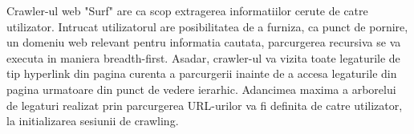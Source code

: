 Crawler-ul web "Surf" are ca scop extragerea informatiilor cerute de catre utilizator. Intrucat utilizatorul are posibilitatea de a furniza, ca punct de pornire, un domeniu web relevant pentru informatia cautata, parcurgerea recursiva se va executa in maniera breadth-first. Asadar, crawler-ul va vizita toate legaturile de tip hyperlink din pagina curenta a parcurgerii inainte de a accesa legaturile din pagina urmatoare din punct de vedere ierarhic. Adancimea maxima a arborelui de legaturi realizat prin parcurgerea URL-urilor va fi definita de catre utilizator, la initializarea sesiunii de crawling.